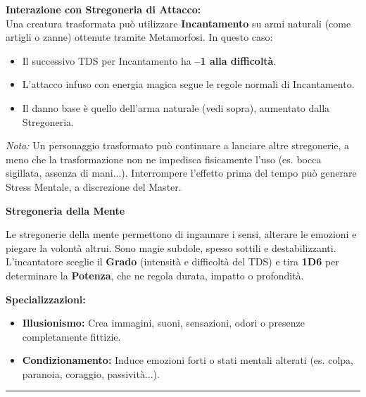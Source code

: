 \documentclass[./magie.tex]{subfiles}
\begin{document}
\vspace{0.5cm}
\textbf{Interazione con Stregoneria di Attacco:} \\
Una creatura trasformata può utilizzare \textbf{Incantamento} su armi naturali (come artigli o zanne) ottenute tramite Metamorfosi. In questo caso:
\begin{itemize}
\item Il successivo TDS per Incantamento ha \textbf{–1 alla difficoltà}.
\item L’attacco infuso con energia magica segue le regole normali di Incantamento.
\item Il danno base è quello dell’arma naturale (vedi sopra), aumentato dalla Stregoneria.
\end{itemize}

\textit{Nota:} Un personaggio trasformato può continuare a lanciare altre stregonerie, a meno che la trasformazione non ne impedisca fisicamente l’uso (es. bocca sigillata, assenza di mani...). Interrompere l’effetto prima del tempo può generare Stress Mentale, a discrezione del Master.


\clearpage
\vspace{0.2cm}
{\zarafirtitlefont\Large\bfseries Stregoneria della Mente}

Le stregonerie della mente permettono di ingannare i sensi, alterare le emozioni e piegare la volontà altrui. Sono magie subdole, spesso sottili e destabilizzanti. L’incantatore sceglie il \textbf{Grado} (intensità e difficoltà del TDS) e tira \textbf{1D6} per determinare la \textbf{Potenza}, che ne regola durata, impatto o profondità.

\textbf{Specializzazioni:}
\begin{itemize}
\item \textbf{Illusionismo:} Crea immagini, suoni, sensazioni, odori o presenze completamente fittizie.
\item \textbf{Condizionamento:} Induce emozioni forti o stati mentali alterati (es. colpa, paranoia, coraggio, passività...).
\end{itemize}
\vspace{0.2cm}
\noindent
\begin{center}
\rule{\textwidth}{0.4pt} 
\end{center}
\vspace{0.2cm}
\end{document}
